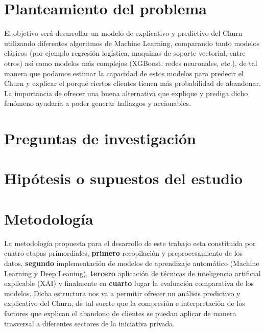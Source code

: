 \section{Planteamiento del problema}

El objetivo será desarrollar un modelo de explicativo y predictivo del Churn utilizando diferentes algoritmos de Machine Learning, comparando tanto modelos clásicos (por ejemplo regresión logística, maquinas de soporte vectorial, entre otros) así como modelos más complejos (XGBoost, redes neuronales, etc.), de tal manera que podamos estimar la capacidad de estos modelos para predecir el Churn y explicar el porqué ciertos clientes tienen más probabilidad de abandonar. La importancia de ofrecer una buena alternativa que explique y prediga dicho fenómeno ayudaría a poder generar hallazgos y accionables.


\section{Preguntas de investigación}



\section{Hipótesis o supuestos del estudio}

\section{Metodología}

La metodología propuesta para el desarrollo de este trabajo esta constituida por cuatro etapas primordiales, \textbf{primero} recopilación y preprocesamiento de los datos, \textbf{segundo} implementación de modelos de aprendizaje automático (Machine Learning y Deep Leaning), \textbf{tercero} aplicación de técnicas de inteligencia artificial explicable (XAI) y finalmente en \textbf{cuarto} lugar la evaluación comparativa de los modelos. Dicha estructura nos va a permitir ofrecer un análisis predictivo y explicativo del Churn, de tal suerte que la compresión e interpretación de los factores que explican el abandono de clientes se puedan aplicar de manera trasversal a diferentes sectores de la iniciativa privada. 


